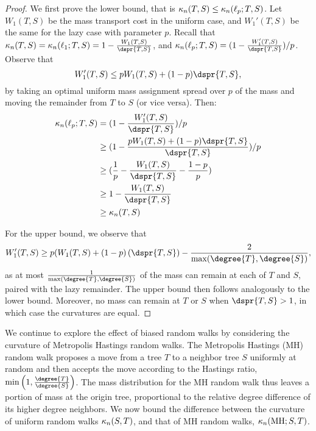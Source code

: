 \documentclass{amsart}
\newcommand{\MH}{\operatorname{MH}}
\newcommand{\curvature}[2][]{%
    \ifthenelse{\equal{#1}{}}%
		{\kappa_n(#2)}%
		{\kappa_n(#1;#2)}%
}
\begin{document}
\begin{proof}
	We first prove the lower bound, that is $\curvature{T,S} \le \curvature[\ell_p]{T,S}$.
	Let $W_1(T,S)$ be the mass transport cost in the uniform case, and $W_1'(T,S)$ be the same for the lazy case with parameter $p$.
	Recall that $\curvature{T,S} = \curvature[\ell_1]{T,S} = 1 - \frac{W_1(T,S)}{\dspr{T,S}}$, and $\curvature[\ell_p]{T,S} = (1 - \frac{W_1'(T,S)}{\dspr{T,S}}) / p$.
	Observe that $$W_1'(T,S) \le pW_1(T,S) + (1-p)\dspr{T,S},$$ by taking an optimal uniform mass assignment spread over $p$ of the mass and moving the remainder from $T$ to $S$ (or vice versa).
	Then:
	\begin{align*}
		\curvature[\ell_p]{T,S} &= (1 - \frac{W_1'(T,S)}{\dspr{T,S}}) / p \\
		&\ge (1 - \frac{pW_1(T,S) + (1-p)\dspr{T,S}}{\dspr{T,S}}) / p \\
		&\ge (\frac{1}{p} - \frac{W_1(T,S)}{\dspr{T,S}} - \frac{1-p}{p}) \\
		&\ge 1 - \frac{W_1(T,S)}{\dspr{T,S}} \\
		&\ge \curvature{T,S}
	\end{align*}

	For the upper bound, we observe that $$W_1'(T,S) \ge p(W_1(T,S) + (1-p)\left(\dspr{T,S}\right) - \frac{2}{\max(\degree{T}, \degree{S})},$$ as at most $\frac{1}{\max(\degree{T},\degree{S})}$ of the mass can remain at each of $T$ and $S$, paired with the lazy remainder.
	The upper bound then follows analogously to the lower bound.
	Moreover, no mass can remain at $T$ or $S$ when $\dspr{T,S} > 1$, in which case the curvatures are equal.
\end{proof}

We continue to explore the effect of biased random walks by considering the curvature of Metropolis Hastings random walks.
The Metropolis Hastings (MH) random walk proposes a move from a tree $T$ to a neighbor tree $S$ uniformly at random and then accepts the move according to the Hastings ratio, $\min\left(1, \frac{\degree{T}}{\degree{S}}\right)$.
The mass distribution for the MH random walk thus leaves a portion of mass at the origin tree, proportional to the relative degree difference of its higher degree neighbors.
We now bound the difference between the curvature of uniform random walks $\curvature{S,T}$, and that of MH random walks, $\curvature[\MH]{S,T}$.
\end{document}
